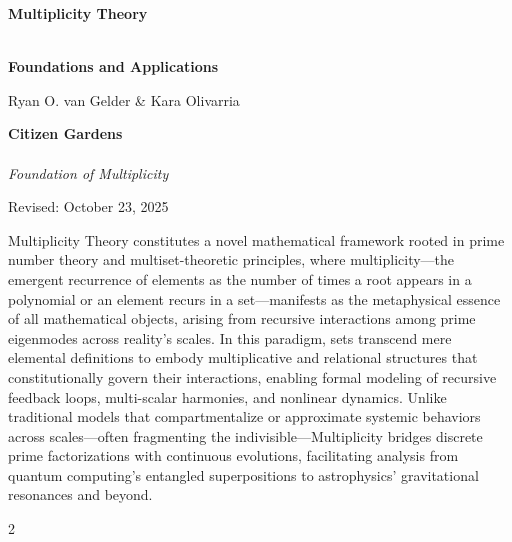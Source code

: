 \documentclass{article}
\theoremstyle{plain}
\begin{document}
\nolinenumbers
\begin{titlepage}
    \centering
 
  \Huge\textbf{Multiplicity Theory}
   \vspace*{0.5em}
  {\LARGE\bfseries \\Foundations and Applications \par}
    \vspace{1cm}
     \Large{Ryan O. van Gelder \& Kara Olivarria \par}
  \vspace{1cm}
     {\bfseries Citizen Gardens} \\ \\
    \textit{Foundation of Multiplicity}
     \vspace{1cm} \\
    {\normalsize Revised: October 23, 2025 \par}
    \vfill

   
    \vspace{0.5em}
    \begin{minipage}{0.85\textwidth}
        \small
      Multiplicity Theory constitutes a novel mathematical framework rooted in prime number theory and multiset-theoretic principles, where multiplicity—the emergent recurrence of elements as the number of times a root appears in a polynomial or an element recurs in a set—manifests as the metaphysical essence of all mathematical objects, arising from recursive interactions among prime eigenmodes across reality's scales. In this paradigm, sets transcend mere elemental definitions to embody multiplicative and relational structures that constitutionally govern their interactions, enabling formal modeling of recursive feedback loops, multi-scalar harmonies, and nonlinear dynamics. Unlike traditional models that compartmentalize or approximate systemic behaviors across scales—often fragmenting the indivisible—Multiplicity bridges discrete prime factorizations with continuous evolutions, facilitating analysis from quantum computing's entangled superpositions to astrophysics' gravitational resonances and beyond.


    \end{minipage}
\end{titlepage}
\newpage
 \begin{multicols}{2}
\begin{singlespace}
\tableofcontents
\end{singlespace}
\end{multicols}
\newpage
\end{document}

